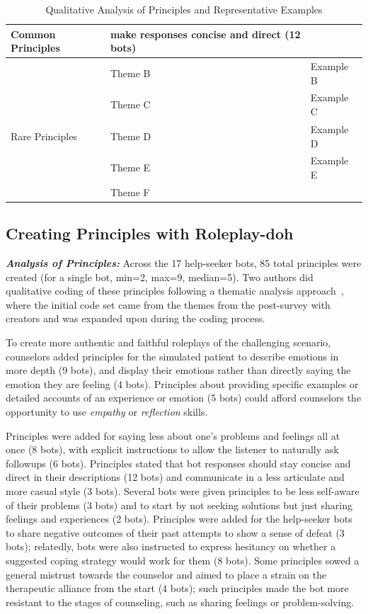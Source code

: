 

\begin{table}
    \centering
    \begin{tabular}{|l|l|l|} \hline 
         Common Principles&  make responses concise and direct (12 bots)&  \\ \hline 
         &  Theme B&  Example B\\ \hline 
         &  Theme C&  Example C\\ \hline 
         Rare Principles&  Theme D&  Example D\\ \hline 
         &  Theme E&  Example E\\ \hline 
         &  Theme F&  \\ \hline
    \end{tabular}
    \caption{Qualitative Analysis of Principles and Representative Examples}
    \label{tab:my_label}
\end{table}
\subsection{Creating Principles with Roleplay-doh}
\textit{\textbf{Analysis of Principles:}} Across the 17 help-seeker bots, 85 total principles were created (for a single bot, min=2, max=9, median=5). Two authors did qualitative coding of these principles following a thematic analysis approach~\cite{braun2006thematicanalysis}, where the initial code set came from the themes from the post-survey with creators and was expanded upon during the coding process. 

To create more authentic and faithful roleplays of the challenging scenario, counselors added principles for the simulated patient to describe emotions in more depth (9 bots), and display their emotions rather than directly saying the emotion they are feeling (4 bots). Principles about providing specific examples or detailed accounts of an experience or emotion (5 bots) could afford counselors the opportunity to use \textit{empathy} or \textit{reflection} skills.

Principles were added for saying less about one's problems and feelings all at once (8 bots), with explicit instructions to allow the listener to naturally ask followups (6 bots). Principles stated that bot responses should stay concise and direct in their descriptions (12 bots) and communicate in a less articulate and more casual style (3 bots). 
Several bots were given principles to be less self-aware of their problems (3 bots) and to start by not seeking solutions but just sharing feelings and experiences (2 bots).  
Principles were added for the help-seeker bots to share negative outcomes of their past attempts to show a sense of defeat (3 bots); relatedly, bots were also instructed to express hesitancy on whether a suggested coping strategy would work for them (8 bots). Some principles sowed a general mistrust towards the counselor and aimed to place a strain on the therapeutic alliance from the start (4 bots); such principles made the bot more resistant to the stages of counseling, such as sharing feelings or problem-solving. 

